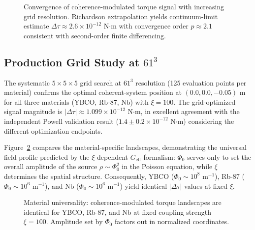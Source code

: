 \documentclass[10pt,twocolumn]{article}
\begin{document}
\begin{figure}[ht]
	\centering
	\caption{Convergence of coherence-modulated torque signal with increasing grid resolution. Richardson extrapolation yields continuum-limit estimate $\Delta\tau \approx 2.6 \times 10^{-12}$ N$\cdot$m with convergence order $p \approx 2.1$ consistent with second-order finite differencing.}
	\label{fig:convergence}
\end{figure}

\subsection{Production Grid Study at $61^3$}

The systematic $5 \times 5 \times 5$ grid search at $61^3$ resolution (125 evaluation points per material) confirms the optimal coherent-system position at $(0.0, 0.0, -0.05)$ m for all three materials (YBCO, Rb-87, Nb) with $\xi = 100$. The grid-optimized signal magnitude is $|\Delta\tau| \approx 1.099 \times 10^{-12}$ N$\cdot$m, in excellent agreement with the independent Powell validation result ($1.4 \pm 0.2 \times 10^{-12}$ N$\cdot$m) considering the different optimization endpoints.

Figure~\ref{fig:materials} compares the material-specific landscapes, demonstrating the universal field profile predicted by the $\xi$-dependent $G_{\text{eff}}$ formalism: $\Phi_0$ serves only to set the overall amplitude of the source $\rho \sim \Phi_0^2$ in the Poisson equation, while $\xi$ determines the spatial structure. Consequently, YBCO ($\Phi_0 \sim 10^8$ m$^{-1}$), Rb-87 ($\Phi_0 \sim 10^6$ m$^{-1}$), and Nb ($\Phi_0 \sim 10^6$ m$^{-1}$) yield identical $|\Delta\tau|$ values at fixed $\xi$.

\begin{figure}[ht]
	\centering
	\caption{Material universality: coherence-modulated torque landscapes are identical for YBCO, Rb-87, and Nb at fixed coupling strength $\xi = 100$. Amplitude set by $\Phi_0$ factors out in normalized coordinates.}
	\label{fig:materials}
\end{figure}
\end{document}
